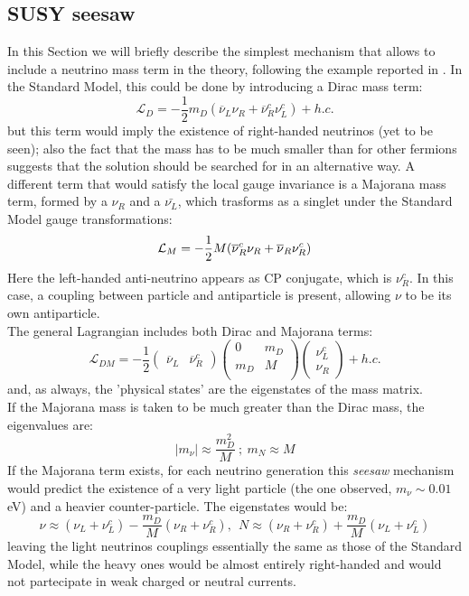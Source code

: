 \documentclass[12pt,a4paper,openright, oneside, titlepage]{book} %
\begin{document}
\subsection{SUSY seesaw}
In this Section we will briefly describe the simplest mechanism that allows to include a neutrino mass term in the theory, following the example reported in \cite{Thomson}. 
In the Standard Model, this could be done by introducing a Dirac mass term:
$$\mathcal{L}_D=-\frac{1}{2}m_D(\overline{\nu}_L\nu_R+\overline{\nu}_R^c\nu_L^c) + h.c.$$
but this term would imply the existence of right-handed neutrinos (yet to be seen); also the fact that the mass has to be much smaller than for other fermions suggests that the solution should be searched for in an alternative way.
A different term that would satisfy the local gauge invariance is a Majorana mass term, formed by a $\nu_R$ and a $\bar{\nu_L}$, which trasforms as a singlet under the Standard Model gauge transformations:
$$\mathcal{L}_M=-\frac{1}{2} M(\overline{\nu}\vphantom{\nu}_R^c\nu_R+\overline{\nu}_R\nu_R^c)$$
Here the left-handed anti-neutrino appears as CP conjugate, which is $\nu_R^c$.
In this case, a coupling between particle and antiparticle is present, allowing $\nu$ to be its own antiparticle.\\
The general Lagrangian includes both Dirac and Majorana terms:
$$\mathcal{L}_{DM}= -\frac{1}{2}
\begin{pmatrix} 
\overline{\nu}_L & \overline{\nu}_R^c 
\end{pmatrix}
\begin{pmatrix} 
0 & m_D\\
m_D & M\\
\end{pmatrix}
\begin{pmatrix} 
\nu_L^c\\
\nu_R
\end{pmatrix} + h.c.$$
and, as always, the 'physical states' are the eigenstates of the mass matrix.\\
If the Majorana mass is taken to be much greater than the Dirac mass, the eigenvalues are:
$$
|m_\nu|\approx \frac{m_D^2}{M}\ ;\ m_N\approx M
$$
If the Majorana term exists, for each neutrino generation
this \textit{seesaw} mechanism would predict the existence of a very light particle (the one observed, $m_\nu\sim0.01$ eV) and a heavier counter-particle.
The eigenstates would be:
$$
\nu\approx (\nu_L+\nu_L^c)-\frac{m_D}{M}(\nu_R+\nu_R^c),\ \
N\approx (\nu_R+\nu_R^c)+\frac{m_D}{M}(\nu_L+\nu_L^c)
$$
leaving the light neutrinos couplings essentially the same as those of the Standard Model, while the heavy ones would be almost entirely right-handed and would not partecipate in weak charged or neutral currents.
\end{document}
